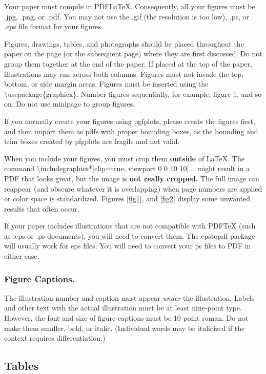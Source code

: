 Your paper must compile in PDF\LaTeX{}. Consequently, all your figures must be .jpg, .png, or .pdf. You may not use the .gif (the resolution is too low), .ps, or .eps file format for your figures.

Figures, drawings, tables, and photographs should be placed throughout the paper on the page (or the subsequent page) where they are first discussed. Do not group them together at the end of the paper. If placed at the top of the paper, illustrations may run across both columns. Figures must not invade the top, bottom, or side margin areas. Figures must be inserted using the \textbackslash usepackage\{graphicx\}. Number figures sequentially, for example, figure 1, and so on. Do not use minipage to group figures.

If you normally create your figures using pgfplots, please create the figures first, and then import them as pdfs with proper bounding boxes, as the bounding and trim boxes created by pfgplots are fragile and not valid.

When you include your figures, you must crop them \textbf{outside} of \LaTeX{}. The command \textbackslash includegraphics*[clip=true, viewport 0 0 10 10]{...} might result in a PDF that looks great, but the image is \textbf{not really cropped.} The full image can reappear (and obscure whatever it is overlapping) when page numbers are applied or color space is standardized. Figures \ref{fig1}, and \ref{fig2} display some unwanted results that often occur.

If your paper includes illustrations that are not compatible with PDF\TeX{} (such as .eps or .ps documents), you will need to convert them. The epstopdf package will usually work for eps files. You will need to convert your ps files to PDF in either case.

\subsubsection {Figure Captions.}The illustration number and caption must appear \textit{under} the illustration. Labels and other text with the actual illustration must be at least nine-point type. However, the font and size of figure captions must be 10 point roman. Do not make them smaller, bold, or italic. (Individual words may be italicized if the context requires differentiation.)

\subsection{Tables}

